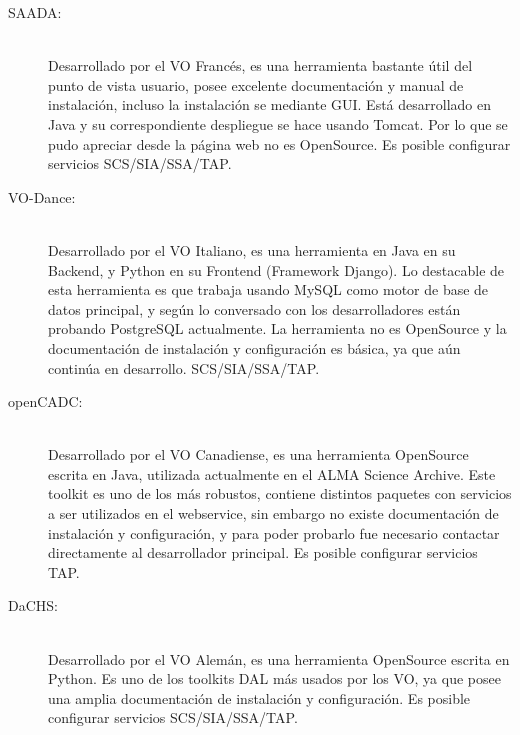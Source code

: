 \begin{description}
    \item[SAADA:] \hfill \\
        Desarrollado por el VO Francés, es una herramienta bastante útil del punto
        de vista usuario, posee excelente documentación y manual de instalación,
        incluso la instalación se mediante GUI.
        Está desarrollado en Java y su correspondiente despliegue se hace usando
        Tomcat.
        Por lo que se pudo apreciar desde la página web no es OpenSource.
        Es posible configurar servicios SCS/SIA/SSA/TAP.

    \item[VO-Dance:] \hfill \\
        Desarrollado por el VO Italiano, es una herramienta en Java en su Backend,
        y Python en su Frontend (Framework Django).
        Lo destacable de esta herramienta es que trabaja usando MySQL como motor de
        base de datos principal, y según lo conversado con los desarrolladores están
        probando PostgreSQL actualmente.
        La herramienta no es OpenSource y la documentación de instalación y
        configuración es básica, ya que aún continúa en desarrollo. SCS/SIA/SSA/TAP.

    \item[openCADC:] \hfill \\
        Desarrollado por el VO Canadiense, es una herramienta OpenSource escrita en
        Java, utilizada actualmente en el ALMA Science Archive.
        Este toolkit es uno de los más robustos, contiene distintos paquetes con
        servicios a ser utilizados en el webservice, sin embargo no existe
        documentación de instalación y configuración, y para poder probarlo fue
        necesario contactar directamente al desarrollador principal.
        Es posible configurar servicios TAP.

    \item[DaCHS:] \hfill \\
        Desarrollado por el VO Alemán, es una herramienta OpenSource escrita en
        Python.
        Es uno de los toolkits DAL más usados por los VO, ya que posee una amplia
        documentación de instalación y configuración.
        Es posible configurar servicios SCS/SIA/SSA/TAP.
\end{description}

